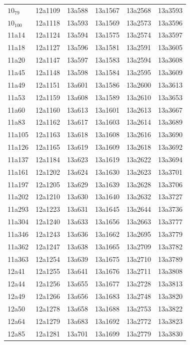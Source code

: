 \documentclass[12pt, oneside]{amsart}
\begin{document}
{\begin{longtable}{*{6}{>{\raggedright\arraybackslash}p{}}}
$10_{79}$ & 12a1109 & 13a588 & 13a1567 & 13a2568 & 13a3593 \\
$10_{100}$ & 12a1118 & 13a593 & 13a1569 & 13a2573 & 13a3596 \\
11a14 & 12a1124 & 13a594 & 13a1575 & 13a2574 & 13a3597 \\
11a18 & 12a1127 & 13a596 & 13a1581 & 13a2591 & 13a3605 \\
11a20 & 12a1147 & 13a597 & 13a1583 & 13a2594 & 13a3608 \\
11a45 & 12a1148 & 13a598 & 13a1584 & 13a2595 & 13a3609 \\
11a49 & 12a1151 & 13a601 & 13a1586 & 13a2600 & 13a3613 \\
11a53 & 12a1159 & 13a608 & 13a1589 & 13a2610 & 13a3653 \\
11a60 & 12a1160 & 13a613 & 13a1601 & 13a2613 & 13a3667 \\
11a83 & 12a1162 & 13a617 & 13a1603 & 13a2614 & 13a3689 \\
11a105 & 12a1163 & 13a618 & 13a1608 & 13a2616 & 13a3690 \\
11a126 & 12a1165 & 13a619 & 13a1609 & 13a2618 & 13a3692 \\
11a137 & 12a1184 & 13a623 & 13a1619 & 13a2622 & 13a3694 \\
11a161 & 12a1202 & 13a624 & 13a1630 & 13a2623 & 13a3701 \\
11a197 & 12a1205 & 13a629 & 13a1639 & 13a2628 & 13a3706 \\
11a202 & 12a1210 & 13a630 & 13a1640 & 13a2632 & 13a3727 \\
11a293 & 12a1223 & 13a631 & 13a1645 & 13a2644 & 13a3736 \\
11a304 & 12a1240 & 13a633 & 13a1656 & 13a2663 & 13a3777 \\
11a346 & 12a1243 & 13a636 & 13a1662 & 13a2695 & 13a3779 \\
11a362 & 12a1247 & 13a638 & 13a1665 & 13a2709 & 13a3782 \\
11a363 & 12a1254 & 13a639 & 13a1675 & 13a2710 & 13a3789 \\
12a41 & 12a1255 & 13a641 & 13a1676 & 13a2711 & 13a3808 \\
12a44 & 12a1256 & 13a655 & 13a1677 & 13a2728 & 13a3813 \\
12a49 & 12a1266 & 13a656 & 13a1683 & 13a2748 & 13a3820 \\
12a50 & 12a1278 & 13a658 & 13a1688 & 13a2753 & 13a3822 \\
12a64 & 12a1279 & 13a683 & 13a1692 & 13a2772 & 13a3823 \\
12a85 & 12a1281 & 13a701 & 13a1699 & 13a2779 & 13a3830 \\

\end{longtable}}
\end{document}
